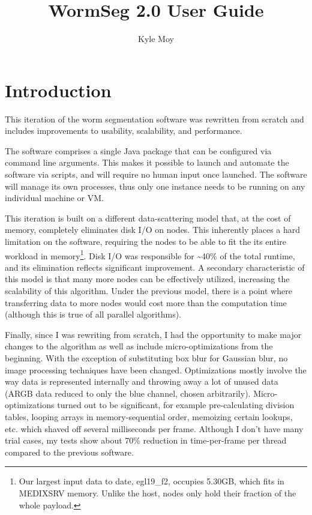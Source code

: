 \documentclass[]{article}
\title{WormSeg 2.0 User Guide}
\author{Kyle Moy}
\begin{document}
\maketitle

\section{Introduction}
This iteration of the worm segmentation software was rewritten from scratch and includes improvements to usability, scalability, and performance.

The software comprises a single Java package that can be configured via command line arguments. This makes it possible to launch and automate the software via scripts, and will require no human input once launched. The software will manage its own processes, thus only one instance needs to be running on any individual machine or VM.

This iteration is built on a different data-scattering model that, at the cost of memory, completely eliminates disk I/O on nodes. This inherently places a hard limitation on the software, requiring the nodes to be able to fit the its entire workload in memory\footnote{Our largest input data to date, egl19\_f2, occupies 5.30GB, which fits in MEDIXSRV memory. Unlike the host, nodes only hold their fraction of the whole payload.}. Disk I/O was responsible for \textasciitilde 40\% of the total runtime, and its elimination reflects significant improvement. A secondary characteristic of this model is that many more nodes can be effectively utilized, increasing the scalability of this algorithm. Under the previous model, there is a point where transferring data to more nodes would cost more than the computation time (although this is true of all parallel algorithms).

Finally, since I was rewriting from scratch, I had the opportunity to make major changes to the algorithm as well as include micro-optimizations from the beginning. With the exception of substituting box blur for Gaussian blur, no image processing techniques have been changed. Optimizations mostly involve the way data is represented internally and throwing away a lot of unused data (ARGB data reduced to only the blue channel, chosen arbitrarily). Micro-optimizations turned out to be significant, for example pre-calculating division tables, looping arrays in memory-sequential order, memoizing certain lookups, etc. which shaved off several milliseconds per frame. Although I don't have many trial cases, my tests show about 70\% reduction in time-per-frame per thread compared to the previous software.
\end{document}

